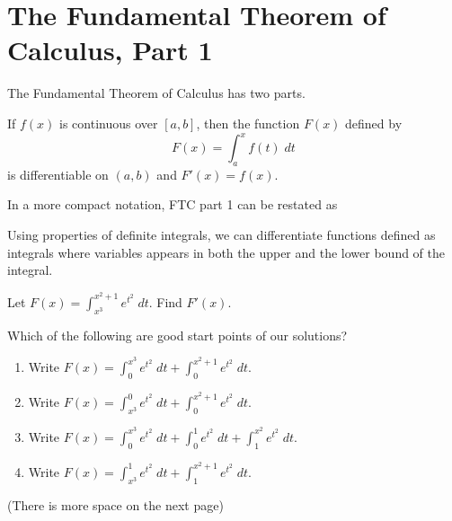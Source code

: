 \documentclass[../main.tex]{subfiles}
\begin{document}
 \section{The Fundamental Theorem of Calculus, Part 1}
  The Fundamental Theorem of Calculus has two parts.

  \begin{mdframed}[style=withref-compact]
    If \(f(x)\) is continuous over \([a,b]\), then the function \(F(x)\) defined by
    \[
      F(x) = \int_{a}^{x} f(t) \;dt
    \]
    is differentiable on \((a,b)\) and \(F'(x) = f(x)\).

  \end{mdframed}

  In a more compact notation, FTC part 1 can be restated as 

  Using properties of definite integrals, we can differentiate functions defined as integrals where variables appears in both the upper and the lower bound of the integral.
  \begin{example} \label{ex:ftc-one}
    Let \(F(x) = \int_{x^{3}}^{x^{2} + 1} e^{t^{2}} \;dt\). Find \(F'(x)\).

    Which of the following are good start points of our solutions?
    \begin{enumerate}[label=(\alph*)]
      \item Write \(F(x) = \int_{0}^{x^{3}} e^{t^{2}} \;dt + \int_{0}^{x^{2}+1} e^{t^{2}} \;dt \).
      \item Write \(F(x) = \int_{x^{3}}^{0} e^{t^{2}} \;dt + \int_{0}^{x^{2}+1} e^{t^{2}} \;dt \).
      \item Write \(F(x) = \int_{0}^{x^{3}} e^{t^{2}} \;dt + \int_{0}^{1} e^{t^{2}} \;dt + \int_{1}^{x^{2}} e^{t^{2}} \;dt\).
      \item Write \(F(x) = \int_{x^{3}}^{1} e^{t^{2}} \;dt + \int_{1}^{x^{2}+1} e^{t^{2}} \;dt \).
    \end{enumerate}

    {\footnotesize (There is more space on the next page)}
  \end{example}
\end{document}
